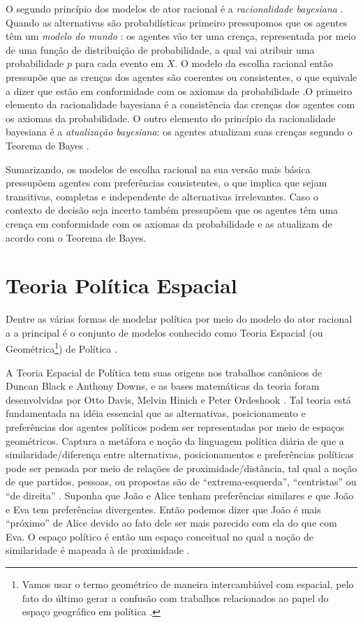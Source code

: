 O segundo princípio dos modelos de ator racional é a \textit{racionalidade
  bayesiana} \cite{gintis2016individuality}. Quando as alternativas são
probabilísticas primeiro pressupomos que os agentes têm um \textit{modelo do
  mundo} \cite{acemoglu2011opinion}: os agentes vão ter uma crença, representada
por meio de uma função de distribuição de probabilidade, a qual vai atribuir uma
probabilidade \(p\) para cada evento em \(X\). O modelo da escolha racional
então pressupõe que as crenças dos agentes são coerentes ou consistentes, o que
equivale a dizer que estão em conformidade com os axiomas da probabilidade
\cite{jackman2009bayesian}.O primeiro elemento da racionalidade bayesiana é a
consistência das crenças dos agentes com os axiomas da probabilidade. O outro
elemento do princípio da racionalidade bayesiana é a \textit{atualização
  bayesiana}: os agentes atualizam suas crenças segundo o Teorema de Bayes
\cite[p.104]{gintis2016individuality}.

Sumarizando, os modelos de escolha racional na sua versão mais básica pressupõem
agentes com preferências consistentes, o que implica que sejam transitivas,
completas e independente de alternativas irrelevantes. Caso o contexto de
decisão seja incerto também pressupõem que os agentes têm uma crença em
conformidade com os axiomas da probabilidade  e as atualizam de acordo com o
Teorema de Bayes.


\section{Teoria Política Espacial}

Dentre as várias formas de modelar política por meio do modelo do ator racional
a a principal é o conjunto de modelos conhecido como Teoria Espacial (ou
Geométrica\footnote{Vamos usar o termo geométrico de maneira intercambiável com
  espacial, pelo fato do último gerar a confusão com trabalhos relacionados ao
  papel do espaço geográfico em política \cite{ward2002spatial,
    poole2005spatial}.}) de Política \cite{van2005political}.

A Teoria Espacial de Política tem suas origens nos trabalhos canônicos de Duncan
Black e Anthony Downs, e as bases matemáticas da teoria foram desenvolvidas por
Otto Davis, Melvin Hinich e Peter Ordeshook \cite{black1958theory,
  downs1957economic, poole2005spatial, miller2015spatial}. Tal teoria está
fundamentada na idéia essencial que as alternativas, posicionamento e
preferências dos agentes políticos podem ser representadas por meio de espaços
geométricos. Captura a metáfora e noção da linguagem política diária de que a
similaridade/diferença entre alternativas, posicionamentos e preferências
políticas pode ser pensada por meio de relações de proximidade/distância, tal
qual a noção de que partidos, pessoas, ou propostas são de ``extrema-esquerda'',
``centristas'' ou ``de direita'' \cite{munger2015choosing}. Suponha que João e
Alice tenham preferências similares e que João e Eva tem preferências
divergentes. Então podemos dizer que João é mais ``próximo'' de Alice devido ao fato
dele ser mais parecido com ela do que com Eva. O espaço político é então um
espaço conceitual no qual a noção de similaridade é mapeada à de proximidade
\cite{laver2014measuring}.


